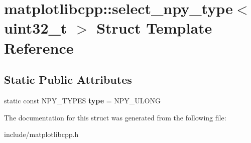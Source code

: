 \hypertarget{structmatplotlibcpp_1_1select__npy__type_3_01uint32__t_01_4}{}\section{matplotlibcpp\+:\+:select\+\_\+npy\+\_\+type$<$ uint32\+\_\+t $>$ Struct Template Reference}
\label{structmatplotlibcpp_1_1select__npy__type_3_01uint32__t_01_4}
\subsection*{Static Public Attributes}
\begin{DoxyCompactItemize}
\item 
static const N\+P\+Y\+\_\+\+T\+Y\+P\+ES {\bfseries type} = N\+P\+Y\+\_\+\+U\+L\+O\+NG\hypertarget{structmatplotlibcpp_1_1select__npy__type_3_01uint32__t_01_4_a21b0fbd17b661ef512cc1c3c728dfa60}{}\label{structmatplotlibcpp_1_1select__npy__type_3_01uint32__t_01_4_a21b0fbd17b661ef512cc1c3c728dfa60}

\end{DoxyCompactItemize}


The documentation for this struct was generated from the following file\+:\begin{DoxyCompactItemize}
\item 
include/matplotlibcpp.\+h\end{DoxyCompactItemize}
